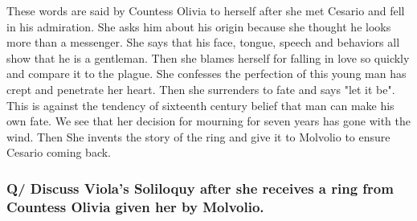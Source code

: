 \documentclass[12pt, a4paper]{article}
\begin{document}
These words are said by Countess Olivia to herself after she met Cesario
and fell in his admiration. She asks him about his origin because she
thought he looks more than a messenger. She says that his face, tongue, 
speech and behaviors all show that he is a gentleman. Then she blames
herself for falling in love so quickly and compare it to the plague. 
She confesses the perfection of this young man has crept and penetrate
her heart. Then she surrenders to fate and says "let it be". This is
against the tendency of sixteenth century belief that man can make his own
fate. We see that her decision for mourning for seven years has gone
with the wind. Then She invents the story of the ring and give it to 
Molvolio to ensure Cesario coming back.

\subsubsection*{Q/ Discuss Viola's Soliloquy after she receives a ring
from Countess Olivia given her by Molvolio.}
\end{document}
